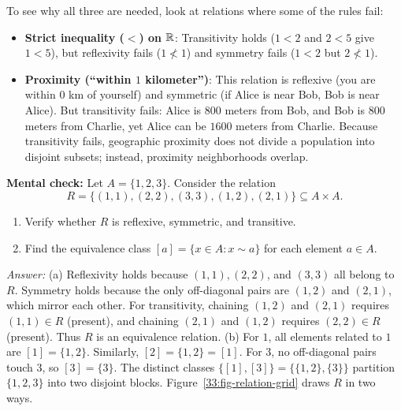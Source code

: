 To see why all three are needed, look at relations where some of the rules fail:
\begin{itemize}
  \item \textbf{Strict inequality ($<$) on $\mathbb{R}$}: Transitivity holds ($1 < 2$ and $2 < 5$ give $1 < 5$), but reflexivity fails ($1 \not< 1$) and symmetry fails ($1 < 2$ but $2 \not< 1$).
  \item \textbf{Proximity (``within $1$ kilometer'')}: This relation is reflexive (you are within $0$ km of yourself) and symmetric (if Alice is near Bob, Bob is near Alice). But transitivity fails: Alice is $800$ meters from Bob, and Bob is $800$ meters from Charlie, yet Alice can be $1600$ meters from Charlie. Because transitivity fails, geographic proximity does not divide a population into disjoint subsets; instead, proximity neighborhoods overlap.
\end{itemize}

\begin{recoverybox}
\textbf{Mental check:} Let $A = \{1, 2, 3\}$. Consider the relation
\[
R = \{(1, 1), (2, 2), (3, 3), (1, 2), (2, 1)\} \subseteq A \times A.
\]
\begin{enumerate}[label=(\alph*)]
  \item Verify whether $R$ is reflexive, symmetric, and transitive.
  \item Find the equivalence class $[a] = \{x \in A : x \sim a\}$ for each element $a \in A$.
\end{enumerate}
\emph{Answer:} (a) Reflexivity holds because $(1, 1), (2, 2)$, and $(3, 3)$ all belong to $R$. Symmetry holds because the only off-diagonal pairs are $(1, 2)$ and $(2, 1)$, which mirror each other. For transitivity, chaining $(1, 2)$ and $(2, 1)$ requires $(1, 1) \in R$ (present), and chaining $(2, 1)$ and $(1, 2)$ requires $(2, 2) \in R$ (present). Thus $R$ is an equivalence relation. (b) For $1$, all elements related to $1$ are $[1] = \{1, 2\}$. Similarly, $[2] = \{1, 2\} = [1]$. For $3$, no off-diagonal pairs touch $3$, so $[3] = \{3\}$. The distinct classes $\{[1], [3]\} = \{\{1, 2\}, \{3\}\}$ partition $\{1, 2, 3\}$ into two disjoint blocks. Figure~\ref{33:fig-relation-grid} draws $R$ in two ways.
\end{recoverybox}

